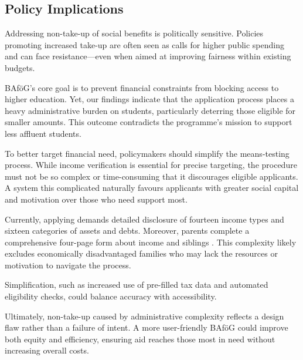 \subsection{Policy Implications}

Addressing non-take-up of social benefits is politically sensitive. Policies promoting increased take-up are often seen as calls for higher public spending and can face resistance—even when aimed at improving fairness within existing budgets.

BAföG’s core goal is to prevent financial constraints from blocking access to higher education. Yet, our findings indicate that the application process places a heavy administrative burden on students, particularly deterring those eligible for smaller amounts. This outcome contradicts the programme’s mission to support less affluent students.

To better target financial need, policymakers should simplify the means-testing process. While income verification is essential for precise targeting, the procedure must not be so complex or time-consuming that it discourages eligible applicants. A system this complicated naturally favours applicants with greater social capital and motivation over those who need support most.

Currently, applying demands detailed disclosure of fourteen income types and sixteen categories of assets and debts. Moreover, parents complete a comprehensive four-page form about income and siblings \citep{fidan_why_2021}. This complexity likely excludes economically disadvantaged families who may lack the resources or motivation to navigate the process.

Simplification, such as increased use of pre-filled tax data and automated eligibility checks, could balance accuracy with accessibility.

Ultimately, non-take-up caused by administrative complexity reflects a design flaw rather than a failure of intent. A more user-friendly BAföG could improve both equity and efficiency, ensuring aid reaches those most in need without increasing overall costs.

